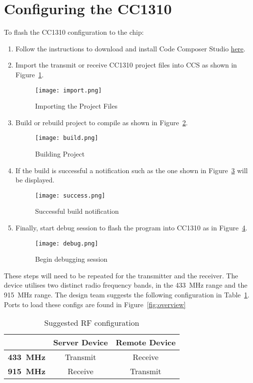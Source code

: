 \section{Configuring the CC1310} %
\label{sec:configuring_the_cc1310}
To flash the CC1310 configuration to the chip:
\begin{enumerate}
	\item Follow the instructions to download and install Code Composer Studio \href{https://www.ti.com/tool/CCSTUDIO/}{here}.
	\item Import the transmit or receive CC1310 project files into CCS as shown in Figure~\ref{fig:CCSimport}.
	\begin{figure}[tbh!]
		\centering
		\texttt{[image: import.png]}
		\caption{Importing the Project Files}
		\label{fig:CCSimport}
	\end{figure}
	\item Build or rebuild project to compile as shown in Figure~\ref{fig:CCSBuild}.
	\begin{figure}[tbh!]
		\centering
		\texttt{[image: build.png]}
		\caption{Building Project}
		\label{fig:CCSBuild}
	\end{figure}
	\item If the build is successful a notification such as the one shown in Figure~\ref{fig:CCSSuccess} will be displayed.
	\begin{figure}[tbh!]
		\centering
		\texttt{[image: success.png]}
		\caption{Successful build notification}
		\label{fig:CCSSuccess}
	\end{figure}
	\item Finally, start debug session to flash the program into CC1310 as in Figure~\ref{fig:CCSDebug}.
	\begin{figure}[tbh!]
		\centering
		\texttt{[image: debug.png]}
		\caption{Begin debugging session}
		\label{fig:CCSDebug}
	\end{figure}
\end{enumerate}

These steps will need to be repeated for the transmitter and the receiver. The device utilises two distinct radio frequency bands, in the \SI{433}{\mega\hertz} range and the \SI{915}{\mega\hertz} range. The design team suggests the following configuration in Table~\ref{tab:RFconfig}. Ports to load these configs are found in Figure~\ref{fig:overview}

\begin{table}[tbh!]
	\caption{Suggested RF configuration}
	\label{tab:RFconfig}
	\centering

	\begin{tabular}{|l|c|c|}
	\hline
	\textbf{} & \textbf{Server Device} & \textbf{Remote Device} \\
	\hline
		\textbf{\SI{433}{\mega\hertz}} & Transmit & Receive\\
	\hline
		\textbf{\SI{915}{\mega\hertz}} & Receive & Transmit \\
	\hline
	\end{tabular}
\end{table}



